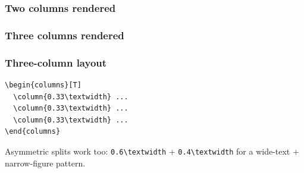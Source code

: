 \documentclass[aspectratio=169,xcolor=table]{beamer}
\begin{document}
\begin{frame}[t]
  \frametitle{Two columns rendered}
\end{frame}

\begin{frame}[t]
  \frametitle{Three columns rendered}
\end{frame}

\begin{frame}[t,fragile]
  \frametitle{Three-column layout}

  \begin{lstlisting}
\begin{columns}[T]
  \column{0.33\textwidth} ...
  \column{0.33\textwidth} ...
  \column{0.33\textwidth} ...
\end{columns}
  \end{lstlisting}

  \vspace{0.4em}
  Asymmetric splits work too: \texttt{0.6\textbackslash textwidth} +
  \texttt{0.4\textbackslash textwidth} for a wide-text + narrow-figure
  pattern.
\end{frame}
\end{document}
